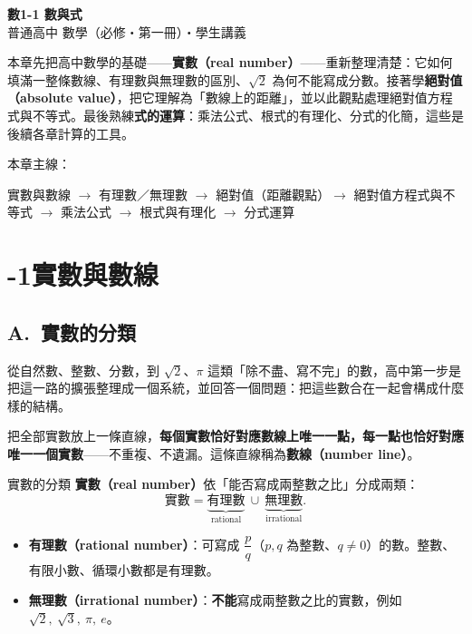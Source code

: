 \documentclass[11pt]{article}
\begin{document}
\begin{center}
{\sffamily\Huge\bfseries 數1-1 數與式}\\[3pt]
{\sffamily\large 普通高中 數學（必修・第一冊）・學生講義}
\end{center}
\vspace{0.6em}

本章先把高中數學的基礎——\textbf{實數（real number）}——重新整理清楚：它如何填滿一整條數線、有理數與無理數的區別、$\sqrt2$ 為何不能寫成分數。接著學\textbf{絕對值（absolute value）}，把它理解為「數線上的距離」，並以此觀點處理絕對值方程式與不等式。最後熟練\textbf{式的運算}：乘法公式、根式的有理化、分式的化簡，這些是後續各章計算的工具。

\medskip
本章主線：

\begin{center}
實數與數線 $\rightarrow$ 有理數／無理數 $\rightarrow$ 絕對值（距離觀點）$\rightarrow$ 絕對值方程式與不等式 $\rightarrow$ 乘法公式 $\rightarrow$ 根式與有理化 $\rightarrow$ 分式運算
\end{center}

\section*{-1\quad 實數與數線}

\subsection*{\sffamily A.\ 實數的分類}

從自然數、整數、分數，到 $\sqrt2$、$\pi$ 這類「除不盡、寫不完」的數，高中第一步是把這一路的擴張整理成一個系統，並回答一個問題：把這些數合在一起會構成什麼樣的結構。

把全部實數放上一條直線，\textbf{每個實數恰好對應數線上唯一一點，每一點也恰好對應唯一一個實數}——不重複、不遺漏。這條直線稱為\textbf{數線（number line）}。

\begin{補充框}{實數的分類}
\textbf{實數（real number）}依「能否寫成兩整數之比」分成兩類：
$$\text{實數}=\underbrace{\text{有理數}}_{\text{rational}}\ \cup\ \underbrace{\text{無理數}}_{\text{irrational}}.$$
\begin{itemize}\setlength{\itemsep}{1pt}
\item \textbf{有理數（rational number）}：可寫成 $\dfrac{p}{q}$（$p,q$ 為整數、$q\ne0$）的數。整數、有限小數、循環小數都是有理數。
\item \textbf{無理數（irrational number）}：\textbf{不能}寫成兩整數之比的實數，例如 $\sqrt2,\ \sqrt3,\ \pi,\ e$。
\end{itemize}
\end{補充框}
\end{document}
